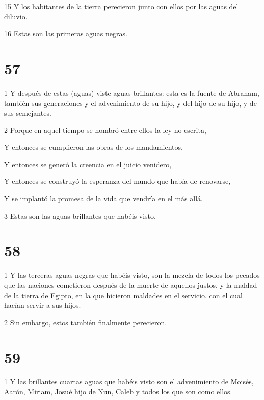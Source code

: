 \par 15 Y los habitantes de la tierra perecieron junto con ellos por las aguas del diluvio.

\par 16 Estas son las primeras aguas negras.

\chapter{57}

\par 1 Y después de estas (aguas) viste aguas brillantes: esta es la fuente de Abraham, también sus generaciones y el advenimiento de su hijo, y del hijo de su hijo, y de sus semejantes.

\par 2 Porque en aquel tiempo se nombró entre ellos la ley no escrita,

\par Y entonces se cumplieron las obras de los mandamientos,

\par Y entonces se generó la creencia en el juicio venidero,

\par Y entonces se construyó la esperanza del mundo que había de renovarse,

\par Y se implantó la promesa de la vida que vendría en el más allá.

\par 3 Estas son las aguas brillantes que habéis visto.

\chapter{58}

\par 1 Y las terceras aguas negras que habéis visto, son la mezcla de todos los pecados que las naciones cometieron después de la muerte de aquellos justos, y la maldad de la tierra de Egipto, en la que hicieron maldades en el servicio. con el cual hacían servir a sus hijos.

\par 2 Sin embargo, estos también finalmente perecieron.

\chapter{59}

\par 1 Y las brillantes cuartas aguas que habéis visto son el advenimiento de Moisés, Aarón, Miriam, Josué hijo de Nun, Caleb y todos los que son como ellos.

